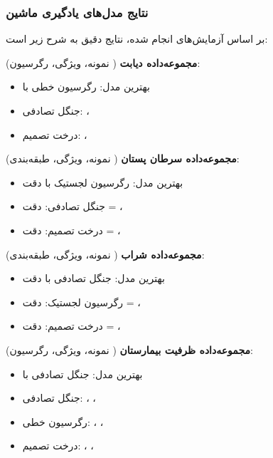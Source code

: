 \documentclass[12pt,a4paper]{article}
\begin{document}
\subsubsection{نتایج مدل‌های یادگیری ماشین}\label{subsubsec:ml_results}

بر اساس آزمایش‌های انجام شده، نتایج دقیق به شرح زیر است:

{\yekanfont \textbf{مجموعه‌داده دیابت}} ( نمونه،  ویژگی، رگرسیون):
\begin{itemize}
\item بهترین مدل: رگرسیون خطی با 
\item جنگل تصادفی: ، 
\item درخت تصمیم: ، 
\end{itemize}

{\iranfont \textbf{مجموعه‌داده سرطان پستان}} ( نمونه،  ویژگی، طبقه‌بندی):
\begin{itemize}
\item بهترین مدل: رگرسیون لجستیک با دقت 
\item جنگل تصادفی: دقت = ، 
\item درخت تصمیم: دقت = ، 
\end{itemize}

\textbf{مجموعه‌داده شراب} ( نمونه،  ویژگی، طبقه‌بندی):
\begin{itemize}
\item بهترین مدل: جنگل تصادفی با دقت 
\item رگرسیون لجستیک: دقت = ، 
\item درخت تصمیم: دقت = ، 
\end{itemize}

\textbf{مجموعه‌داده ظرفیت بیمارستان} ( نمونه،  ویژگی، رگرسیون):
\begin{itemize}
\item بهترین مدل: جنگل تصادفی با 
\item جنگل تصادفی: ، ، 
\item رگرسیون خطی: ، ، 
\item درخت تصمیم: ، ، 
\end{itemize}
\end{document}
